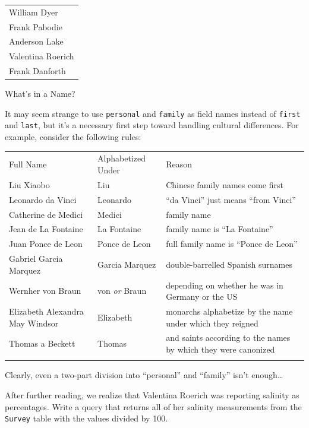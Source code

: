 \documentclass{book}
\begin{document}
\begin{tabular}{l}
William Dyer \\
Frank Pabodie \\
Anderson Lake \\
Valentina Roerich \\
Frank Danforth \\
\end{tabular}

\begin{swcbox}{What's in a Name?}

It may seem strange to use \texttt{personal} and \texttt{family} as
field names instead of \texttt{first} and \texttt{last}, but it's a
necessary first step toward handling cultural differences. For example,
consider the following rules:

\begin{tabular}{lll}
\hline\noalign{\medskip}
Full Name & Alphabetized Under & Reason
\\\noalign{\medskip}
\hline\noalign{\medskip}
Liu Xiaobo & Liu & Chinese family names come first
\\\noalign{\medskip}
Leonardo da Vinci & Leonardo & ``da Vinci'' just means ``from Vinci''
\\\noalign{\medskip}
Catherine de Medici & Medici & family name
\\\noalign{\medskip}
Jean de La Fontaine & La Fontaine & family name is ``La Fontaine''
\\\noalign{\medskip}
Juan Ponce de Leon & Ponce de Leon & full family name is ``Ponce de
Leon''
\\\noalign{\medskip}
Gabriel Garcia Marquez & Garcia Marquez & double-barrelled Spanish
surnames
\\\noalign{\medskip}
Wernher von Braun & von \emph{or} Braun & depending on whether he was in
Germany or the US
\\\noalign{\medskip}
Elizabeth Alexandra May Windsor & Elizabeth & monarchs alphabetize by
the name under which they reigned
\\\noalign{\medskip}
Thomas a Beckett & Thomas & and saints according to the names by which
they were canonized
\\\noalign{\medskip}
\hline
\end{tabular}

Clearly, even a two-part division into ``personal'' and ``family'' isn't
enough\ldots{}

\end{swcbox}

\begin{challenge}
  After further reading, we realize that Valentina Roerich was reporting
  salinity as percentages. Write a query that returns all of her
  salinity measurements from the \texttt{Survey} table with the values
  divided by 100.
\end{challenge}
\end{document}
